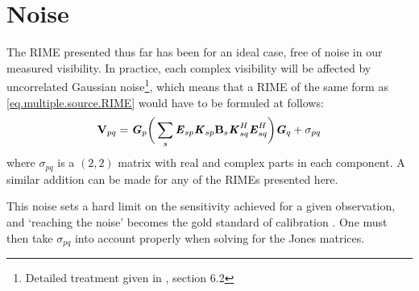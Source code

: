 \section{Noise}
\label{section.RIME.noise}

\pg
The RIME presented thus far has been for an ideal case, free of noise in our measured visibility. In practice, each complex visibility will be affected by uncorrelated Gaussian noise\footnote{Detailed treatment given in , section 6.2}, which means that a RIME of the same form as \cref{eq.multiple.source.RIME} would have to be formuled at follows:
\begin{equation}
\textbf{V}_{pq} = \textbf{\emph{G}}_p \bigg( \sum_s \textbf{\emph{E}}_{sp} \textbf{\emph{K}}_{sp} \textbf{B}_{s} \textbf{\emph{K}}_{sq}^H \textbf{\emph{E}}_{sq}^H \bigg) \textbf{\emph{G}}_q + \sigma_{pq}
\end{equation}
where $\sigma_{pq}$ is a $(2,2)$ matrix with real and complex parts in each component. A similar addition can be made for any of the RIMEs presented here.

\pg
This noise sets a hard limit on the sensitivity achieved for a given observation, and `reaching the noise' becomes the gold standard of calibration . One must then take $\sigma_{pq}$ into account properly when solving for the Jones matrices.



